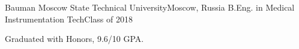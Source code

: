 \resumeSubheading
{Bauman Moscow State Technical University}{Moscow, Russia}
{B.Eng. in Medical Instrumentation Tech}{Class of 2018}
\begin{itemize}[leftmargin=0in, label={}]
    \small{\item{
        {Graduated with Honors, 9.6/10 GPA.}\\
    }}
\end{itemize}
